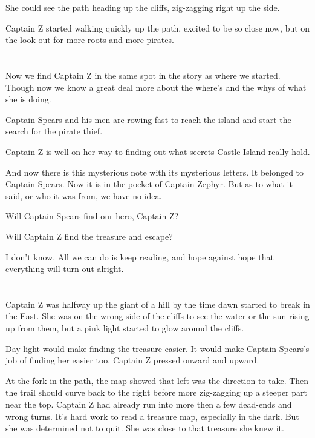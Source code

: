 \documentclass[12pt]{extbook}
\begin{document}
  She could see the path heading up the cliffs, zig-zagging right up the
  side.
  
  Captain Z started walking quickly up the path, excited to be so close
  now, but on the look out for more roots and more pirates.
  
  \section{}\label{section-15}
  
  Now we find Captain Z in the same spot in the story as where we started.
  Though now we know a great deal more about the where's and the whys of
  what she is doing.
  
  Captain Spears and his men are rowing fast to reach the island and start
  the search for the pirate thief.
  
  Captain Z is well on her way to finding out what secrets Castle Island
  really hold.
  
  And now there is this mysterious note with its mysterious letters. It
  belonged to Captain Spears. Now it is in the pocket of Captain Zephyr.
  But as to what it said, or who it was from, we have no idea.
  
  Will Captain Spears find our hero, Captain Z?
  
  Will Captain Z find the treasure and escape?
  
  I don't know. All we can do is keep reading, and hope against hope that
  everything will turn out alright.
  
  \section{}\label{section-16}
  
  Captain Z was halfway up the giant of a hill by the time dawn started to
  break in the East. She was on the wrong side of the cliffs to see the
  water or the sun rising up from them, but a pink light started to glow
  around the cliffs.
  
  Day light would make finding the treasure easier. It would make Captain
  Spears's job of finding her easier too. Captain Z pressed onward and
  upward.
  
  At the fork in the path, the map showed that left was the direction to
  take. Then the trail should curve back to the right before more
  zig-zagging up a steeper part near the top. Captain Z had already run
  into more then a few dead-ends and wrong turns. It's hard work to read a
  treasure map, especially in the dark. But she was determined not to
  quit. She was close to that treasure she knew it.
  
\end{document}
